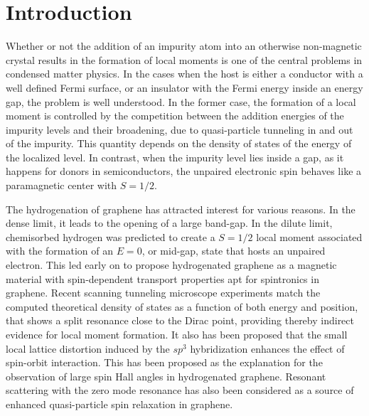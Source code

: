 \documentclass[aps,prb,twocolumn,superscriptaddress]{revtex4-1}
\begin{document}
\maketitle

\section{Introduction}
Whether or not the addition of an impurity atom into an otherwise non-magnetic crystal results in the formation of local moments is one of the central problems in condensed matter physics.\cite{anderson1961localized}
In the cases when the host is either a conductor with a well defined Fermi surface, or an insulator with the Fermi energy inside an energy gap, the problem is well understood.
In the former case, the formation of a local moment is controlled by the competition between the addition energies of the impurity levels and their broadening, due to quasi-particle tunneling in and out of the impurity\cite{anderson1961localized,Daybell1968}. This quantity depends on the density of states of the energy of the localized level.
In contrast, when the impurity level lies inside a gap, as it happens for donors in semiconductors, the unpaired electronic spin behaves like a paramagnetic center with $S=1/2$.\cite{Slichter1955}


The hydrogenation of graphene has attracted interest for various reasons. In
the dense limit, it leads to the opening of a large
band-gap.\cite{elias2009,Sofo2007} In the dilute limit, chemisorbed hydrogen
was predicted to create a $S=1/2$ local moment
\cite{Duplock2004,yazyev2007,Boukhvalov2008,Palacios2008,Yazyev2010,santos2012} associated
with the formation of an $E=0$, or mid-gap, state that hosts an unpaired electron.
This led early on to propose hydrogenated graphene as a magnetic material with
spin-dependent transport properties\cite{Soriano2010,Leconte2011,Soriano2011}
apt for spintronics in graphene.\cite{han2014graphene} Recent scanning
tunneling microscope experiments\cite{gonzalez2016atomic} match the computed
theoretical density of states as a function of both energy and position, that
shows a split resonance close to the Dirac point, providing thereby indirect
evidence for local moment formation. %
It also has been proposed that the small local lattice distortion induced by
the $sp^3$ hybridization enhances the effect of spin-orbit
interaction.\cite{Castro2009,gmitra13} This has been proposed as the
explanation for the observation of large spin Hall angles in hydrogenated
graphene.\cite{balakrishnan2013colossal} Resonant scattering with the zero mode
resonance has also been considered as a source of enhanced quasi-particle spin
relaxation in graphene.\cite{Wojtaszek2013,Kochan2014,soriano2015}
\end{document}
